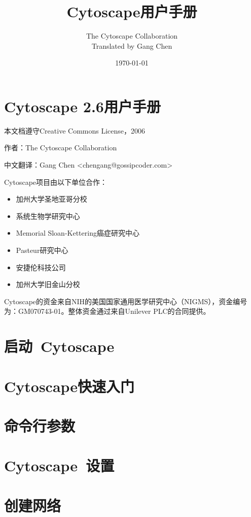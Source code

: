 \documentclass[a4paper, oneside]{book}
\author{The Cytoscape Collaboration \\ Translated by Gang Chen}
\title{Cytoscape用户手册}
\date{\today}
\begin{document}
\begin{CJK}{UTF8}{gbsn}
\maketitle
\tableofcontents

\chapter*{Cytoscape 2.6用户手册}
本文档遵守Creative Commons License，2006

作者：The Cytoscape Collaboration

中文翻译：Gang Chen <chengang@gossipcoder.com>

Cytoscape项目由以下单位合作：
\begin{itemize}
\item 加州大学圣地亚哥分校
\item 系统生物学研究中心
\item Memorial Sloan-Kettering癌症研究中心
\item Pasteur研究中心
\item 安捷伦科技公司
\item 加州大学旧金山分校
\end{itemize}

Cytoscape的资金来自NIH的美国国家通用医学研究中心（NIGMS），资金编号为：GM070743-01。整体资金通过来自Unilever PLC的合同提供。



\chapter{启动~Cytoscape}


\chapter{Cytoscape快速入门}


\chapter{命令行参数}


\chapter{Cytoscape~设置}


\chapter{创建网络}



\end{CJK}
\end{document}
